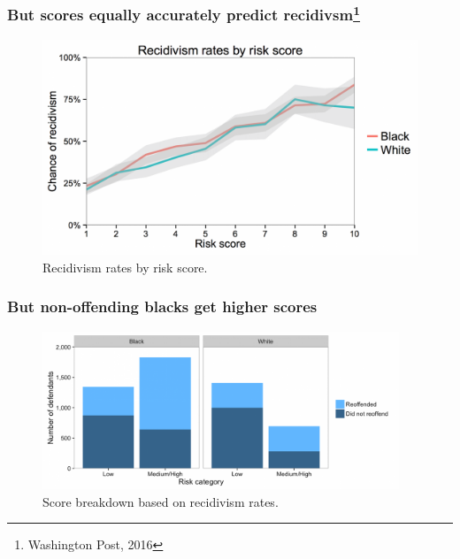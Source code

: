 \begin{frame}
  \frametitle{But scores equally accurately predict recidivsm\footnote{Washington Post, 2016}}
  \begin{figure}[H]
    \centering
    \includegraphics[width=\columnwidth]{../figures/imrs}
    \caption{Recidivism rates by risk score.}
    \label{fig:imrs}
  \end{figure}
\end{frame}
\begin{frame}
  \frametitle{But non-offending blacks get higher scores}
  \begin{figure}[H]
    \centering
    \includegraphics[width=0.95\textwidth]{../figures/imrs-risk}
    \caption{Score breakdown based on recidivism rates.}
    \label{fig:imrs-risk}
  \end{figure}
\end{frame}

